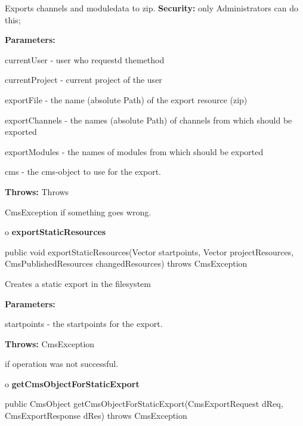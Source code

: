 \begin{description}
\htmlDD Exports channels and moduledata to zip. {\bf Security:} only
Administrators can do this; 

\begin{description}
\item {\bf Parameters:}  

currentUser - user who requestd themethod  

currentProject - current project of the user  

exportFile - the name (absolute Path) of the export resource (zip)  

exportChannels - the names (absolute Path) of channels from which should be
exported  

exportModules - the names of modules from which should be exported  

cms - the cms-object to use for the export.  
\item {\bf Throws:} Throws  

CmsException if something goes wrong.  
\end{description}

\end{description}

o {\bf exportStaticResources} 

\begin{PRE}
 public void exportStaticResources(Vector startpoints,
                                   Vector projectResources,
                                   CmsPublishedResources changedResources) throws CmsException
\end{PRE}

\begin{description}
\htmlDD Creates a static export in the filesystem 

\begin{description}
\item {\bf Parameters:}  

startpoints - the startpoints for the export.  
\item {\bf Throws:} CmsException  

if operation was not successful.  
\end{description}

\end{description}

o {\bf getCmsObjectForStaticExport} 

\begin{PRE}
 public CmsObject getCmsObjectForStaticExport(CmsExportRequest dReq,
                                              CmsExportResponse dRes) throws CmsException
\end{PRE}


